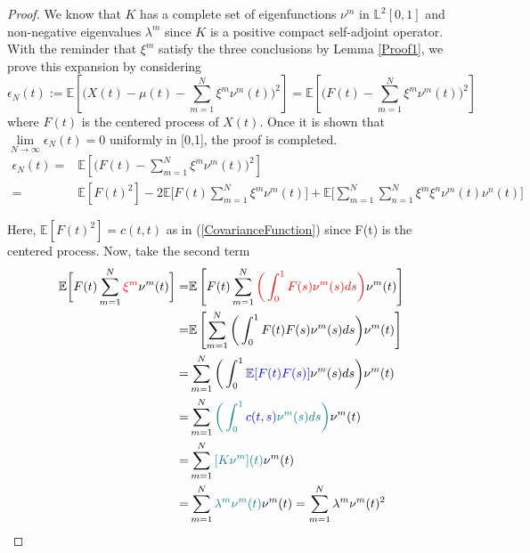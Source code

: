 \documentclass[11pt,twoside,a4paper]{article}
\begin{document}
	\begin{proof}
		We know that $K$ has a complete set of eigenfunctions ${\nu^m}$ in $\mathbb{L}^{2}[0,1]$  and non-negative eigenvalues $\lambda^m$ since $K$ is a positive compact self-adjoint operator. With the reminder that $\xi^m$ satisfy the three conclusions by Lemma \ref{Proof1}, we prove this expansion by considering
		\begin{equation}
			\epsilon_{N}(t) := \mathbb{E} \left[\bigg( X(t) -\mu(t)- \sum_{m=1}^{N} \xi^m \nu^m(t)\bigg)^2 \right]
			= \mathbb{E} \left[\bigg( F(t) - \sum_{m=1}^{N} \xi^m \nu^m(t)\bigg)^2 \right]
		\end{equation}
		where $F(t)$ is the centered process of $X(t)$.
		Once it is shown that $\lim\limits_{N \rightarrow \infty} \epsilon_{N}(t) = 0$ uniformly in [0,1], the proof is completed.
		\begin{equation}\label{Thr1}
			\begin{split}
				\epsilon_{N}(t) = &\mathbb{E} \left[\bigg( F(t) - \sum_{m=1}^{N} \xi^m 	\nu^m(t)\bigg)^2 \right]\\
				= & \mathbb{E}[F(t)^{2}] - 2\mathbb{E}\bigg[F(t)\sum_{m=1}^{N}\xi^m\nu^m(t)\bigg] + \mathbb{E}\bigg[\sum_{m=1}^{N}\sum_{n=1}^{N}\xi^m\xi^n\nu^m(t)\nu^n(t)\bigg]
			\end{split}
		\end{equation}
		
		Here, $\mathbb{E}[F(t)^{2}] = c(t,t)$ as in (\ref{CovarianceFunction}) since F(t) is the centered process. Now, take the second term
		\begin{equation}\label{Thr2}
			\begin{split}
				\mathbb{E} \bigg[ F(t) \sum_{m=1}^{N} {\color{red}\xi^m}\nu^m(t) \bigg] = & \mathbb{E} \left[ F(t) \sum_{m=1}^{N} {\color{red}\bigg(\int_{0}^{1} F(s)\nu^m(s)ds\bigg)} \nu^m(t) \right]\\
				= & \mathbb{E} \left[ \sum_{m=1}^{N} \bigg(\int_{0}^{1} F(t)F(s)\nu^m(s)ds\bigg) \nu^m(t) \right]\\
				= & \sum_{m=1}^{N} \bigg(\int_{0}^{1} {\color{blue}\mathbb{E}[F(t)F(s)]}\nu^m(s)ds\bigg)\nu^m(t)\\
				= & \sum_{m=1}^{N} {\color{teal}\bigg(\int_{0}^{1} {\color{blue}c(t,s)} \nu^m(s)ds\bigg)}\nu^m(t)\\
				= & \sum_{m=1}^{N}{\color{teal}[K\nu^m](t)}\nu^m(t) \\
				= &\sum_{m=1}^{N}{\color{teal}\lambda^m\nu^m(t)}\nu^m(t) = \sum_{m=1}^{N}\lambda^m\nu^m(t)^{2}
			\end{split}
		\end{equation} 
		

\end{proof}
\end{document}
